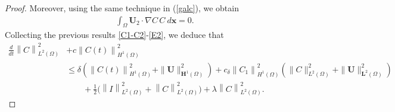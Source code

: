 \documentclass[10pt,a4paper]{amsart}
\begin{document}
\begin{proof}
	
	\noindent
		Moreover, using the same technique in (\ref{galc}), we obtain
		\begin{equation}\label{E2}
			\begin{aligned}
				\int_{\Omega} \boldsymbol{U}_{2} \cdot\nabla C\, C~d{\mathbf{x}}=0.
			\end{aligned}
		\end{equation} 
		Collecting the previous results \eqref{C1-C2}-\eqref{E2}, we deduce that
		\begin{equation}\label{estmtheta}
			\begin{split}
				\frac{d}{d t}\left\|C\right\|_{L^{2}(\Omega)}^{2}&+c\left\|C(t)\right\|_{H^{1}(\Omega)}^{2}
				\\&\leq \delta\left(\left\|C(t)\right\|_{H^{1}(\Omega)}^{2}+\|\boldsymbol{U}\|_{\mathbf{H}^{1}(\Omega)}^{2}\right)+c_{\delta}\left\|C_1\right\|_{H^{1}(\Omega)}^{2} \left(\|C\|_{L^{2}(\Omega)}^{2}+\|\boldsymbol{U}\|_{\mathbf{L}^{2}(\Omega)}^{2}\right)\\
				&\qquad+\frac{1}{2}\Big(\left\|I\right\|_{L^{2}(\Omega)}^{2}+\left\|C\right\|_{L^{2}(\Omega)}^{2}\Big)+\lambda\left\|C\right\|_{L^{2}(\Omega)}^{2}.
			\end{split}
		\end{equation}
		

\end{proof}
\end{document}
